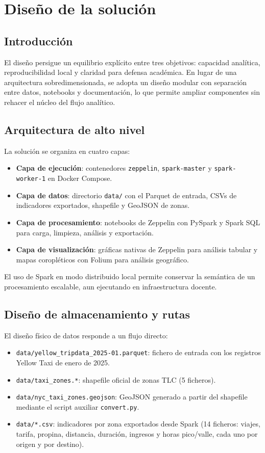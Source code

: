 \chapter{Diseño de la solución}\label{cap:diseno}

\section{Introducción}
El diseño persigue un equilibrio explícito entre tres objetivos: capacidad analítica,
reproducibilidad local y claridad para defensa académica. En lugar de una arquitectura
sobredimensionada, se adopta un diseño modular con separación entre datos, notebooks y
documentación, lo que permite ampliar componentes sin rehacer el núcleo del flujo
analítico.

\section{Arquitectura de alto nivel}
La solución se organiza en cuatro capas:

\begin{itemize}
	\item \textbf{Capa de ejecución}: contenedores \texttt{zeppelin},
	\texttt{spark-master} y \texttt{spark-worker-1} en Docker Compose.
	\item \textbf{Capa de datos}: directorio \texttt{data/} con el Parquet de
	entrada, CSVs de indicadores exportados, shapefile y GeoJSON de zonas.
	\item \textbf{Capa de procesamiento}: notebooks de Zeppelin con PySpark y
	Spark SQL para carga, limpieza, análisis y exportación.
	\item \textbf{Capa de visualización}: gráficas nativas de Zeppelin para
	análisis tabular y mapas coropléticos con Folium para análisis geográfico.
\end{itemize}

El uso de Spark en modo distribuido local permite conservar la semántica de un
procesamiento escalable, aun ejecutando en infraestructura docente.

\section{Diseño de almacenamiento y rutas}
El diseño físico de datos responde a un flujo directo:

\begin{itemize}
	\item \texttt{data/yellow\_tripdata\_2025-01.parquet}: fichero de entrada
	con los registros Yellow Taxi de enero de 2025.
	\item \texttt{data/taxi\_zones.*}: shapefile oficial de zonas TLC (5 ficheros).
	\item \texttt{data/nyc\_taxi\_zones.geojson}: GeoJSON generado a partir del
	shapefile mediante el script auxiliar \texttt{convert.py}.
	\item \texttt{data/*.csv}: indicadores por zona exportados desde Spark
	(14 ficheros: viajes, tarifa, propina, distancia, duración, ingresos y horas
	pico/valle, cada uno por origen y por destino).
\end{itemize}

